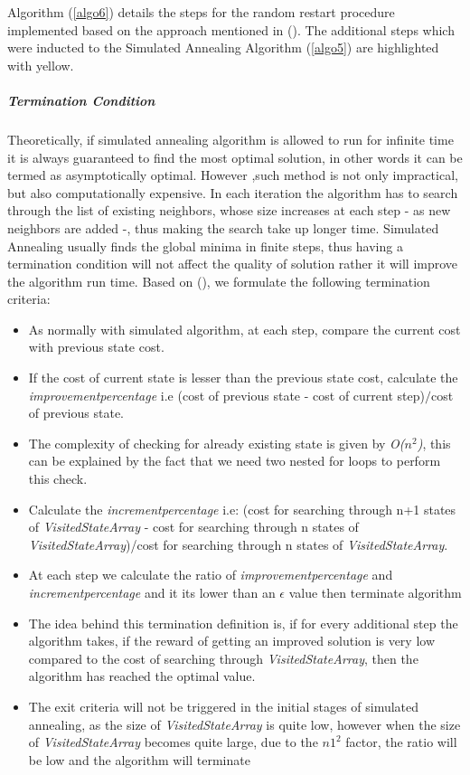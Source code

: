 Algorithm (\ref{algo6}) details the steps for the random restart procedure implemented based on the approach mentioned in (\citet{mendivil2001restarting}). The additional steps which were inducted to the Simulated Annealing Algorithm (\ref{algo5}) are highlighted with yellow. 
\subparagraph{Termination Condition}
Theoretically, if simulated annealing algorithm is allowed to run for infinite time it is always guaranteed to find the most optimal solution, in other words it can be termed as asymptotically optimal. However ,such method is not only impractical, but also computationally expensive. In each iteration the algorithm has to search through the list of existing neighbors, whose size increases at each step - as new neighbors are added -, thus making the search take up longer time. Simulated Annealing usually finds the global minima in finite steps, thus having a termination condition will not affect the quality of solution rather it will improve the algorithm run time. Based on (\citet{alizamir2008improving}), we formulate the following termination criteria:
\begin{itemize}
	\item As normally with simulated algorithm, at each step, compare the current cost with previous state cost.
	\item If the cost of current state is lesser than the previous state cost, calculate the \textit{improvementpercentage} i.e (cost of previous state - cost of current step)$/$cost of previous state.
	\item The complexity of checking for already existing state is given by \textit{O($n^{2}$)}, this can be explained by the fact that we need two nested for loops to perform this check. 
	\item Calculate the \textit{incrementpercentage} i.e: (cost for searching through n+1 states of \textit{VisitedStateArray} - cost for searching through n states of \textit{VisitedStateArray})/cost for searching through n states of \textit{VisitedStateArray}.
	\item At each step we calculate the ratio of \textit{improvementpercentage} and \textit{incrementpercentage} and it its lower than an $\epsilon$ value then terminate algorithm
	\item The idea behind this termination definition is, if for every additional step the algorithm takes, if the reward of getting an improved solution is very low compared to the cost of searching through \textit{VisitedStateArray}, then the algorithm has reached the optimal value.
	\item The exit criteria will not be triggered in the initial stages of simulated annealing, as the size of \textit{VisitedStateArray} is quite low, however when the size of \textit{VisitedStateArray} becomes quite large, due to the $n1^{2}$ factor, the ratio will be low and the algorithm will terminate
\end{itemize}

